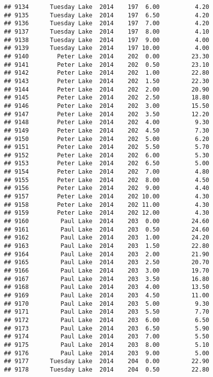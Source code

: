 \documentclass[
]{article}
\begin{document}
\begin{verbatim}
## 9134      Tuesday Lake  2014    197  6.00          4.20
## 9135      Tuesday Lake  2014    197  6.50          4.20
## 9136      Tuesday Lake  2014    197  7.00          4.20
## 9137      Tuesday Lake  2014    197  8.00          4.10
## 9138      Tuesday Lake  2014    197  9.00          4.00
## 9139      Tuesday Lake  2014    197 10.00          4.00
## 9140        Peter Lake  2014    202  0.00         23.30
## 9141        Peter Lake  2014    202  0.50         23.10
## 9142        Peter Lake  2014    202  1.00         22.80
## 9143        Peter Lake  2014    202  1.50         22.30
## 9144        Peter Lake  2014    202  2.00         20.90
## 9145        Peter Lake  2014    202  2.50         18.80
## 9146        Peter Lake  2014    202  3.00         15.50
## 9147        Peter Lake  2014    202  3.50         12.20
## 9148        Peter Lake  2014    202  4.00          9.30
## 9149        Peter Lake  2014    202  4.50          7.30
## 9150        Peter Lake  2014    202  5.00          6.20
## 9151        Peter Lake  2014    202  5.50          5.70
## 9152        Peter Lake  2014    202  6.00          5.30
## 9153        Peter Lake  2014    202  6.50          5.00
## 9154        Peter Lake  2014    202  7.00          4.80
## 9155        Peter Lake  2014    202  8.00          4.50
## 9156        Peter Lake  2014    202  9.00          4.40
## 9157        Peter Lake  2014    202 10.00          4.30
## 9158        Peter Lake  2014    202 11.00          4.30
## 9159        Peter Lake  2014    202 12.00          4.30
## 9160         Paul Lake  2014    203  0.00         24.60
## 9161         Paul Lake  2014    203  0.50         24.60
## 9162         Paul Lake  2014    203  1.00         24.20
## 9163         Paul Lake  2014    203  1.50         22.80
## 9164         Paul Lake  2014    203  2.00         21.90
## 9165         Paul Lake  2014    203  2.50         20.70
## 9166         Paul Lake  2014    203  3.00         19.70
## 9167         Paul Lake  2014    203  3.50         16.80
## 9168         Paul Lake  2014    203  4.00         13.50
## 9169         Paul Lake  2014    203  4.50         11.00
## 9170         Paul Lake  2014    203  5.00          9.30
## 9171         Paul Lake  2014    203  5.50          7.70
## 9172         Paul Lake  2014    203  6.00          6.50
## 9173         Paul Lake  2014    203  6.50          5.90
## 9174         Paul Lake  2014    203  7.00          5.50
## 9175         Paul Lake  2014    203  8.00          5.10
## 9176         Paul Lake  2014    203  9.00          5.00
## 9177      Tuesday Lake  2014    204  0.00         22.90
## 9178      Tuesday Lake  2014    204  0.50         22.80

\end{verbatim}
\end{document}
